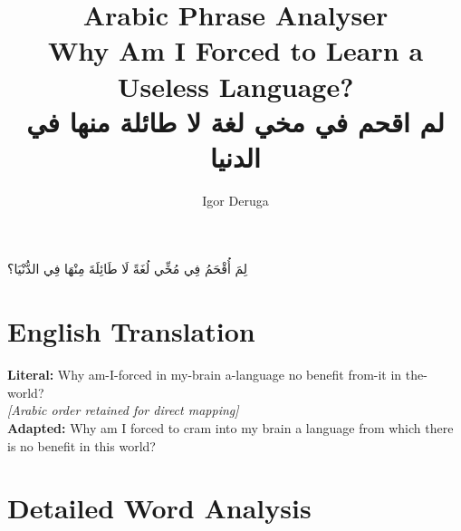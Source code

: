 \documentclass[letterpaper,12pt]{article}
\begin{document}
\title{\textbf{\Large Arabic Phrase Analyser}\\
\large Why Am I Forced to Learn a Useless Language?\\
\normalsize \textarabic{لم اقحم في مخي لغة لا طائلة منها في الدنيا}}
\author{Igor Deruga}
\date{}
\maketitle

\begin{tcolorbox}[colback=boxcolor,colframe=headercolor,title=\textbf{Arabic Phrase with Full Diacritics},breakable]
\centering
\large\textarabic{لِمَ أُقْحَمُ فِي مُخِّي لُغَةً لَا طَائِلَةَ مِنْهَا فِي الدُّنْيَا؟}
\end{tcolorbox}

\section{English Translation}
\begin{tcolorbox}[colback=white,colframe=accentcolor,breakable]
\textbf{Literal:} Why am-I-forced in my-brain a-language no benefit from-it in the-world?\\
\textit{[Arabic order retained for direct mapping]}\\[0.5em]
\textbf{Adapted:} Why am I forced to cram into my brain a language from which there is no benefit in this world?
\end{tcolorbox}

\section{Detailed Word Analysis}
\end{document}
